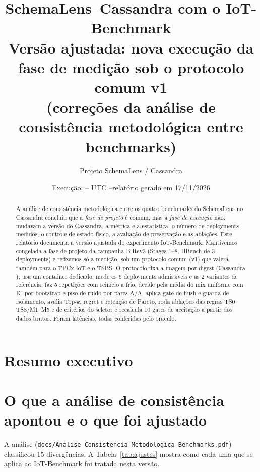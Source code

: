 \documentclass[11pt,a4paper]{article}
\title{\textbf{SchemaLens--Cassandra com o IoT-Benchmark}\\[4pt]
\large Versão ajustada: nova execução da fase de medição sob o protocolo comum v1\\
(correções da análise de consistência metodológica entre benchmarks)}
\author{Projeto SchemaLens / Cassandra}
\date{Execução: \envstarted--\envfinished{} UTC \quad--\quad relatório gerado em 17/11/2026}
\begin{document}
\maketitle

\begin{abstract}
\noindent A análise de consistência metodológica entre os quatro benchmarks do SchemaLens no Cassandra concluiu que a \emph{fase de projeto} é comum, mas a \emph{fase de execução} não: mudavam a versão do Cassandra, a métrica e a estatística, o número de deployments medidos, o controle de estado físico, a avaliação de preservação e as ablações. Este relatório documenta a versão ajustada do experimento IoT-Benchmark. Mantivemos congelada a fase de projeto da campanha B Rev3 (Stages 1--8, HBench de 3 deployments) e refizemos só a medição, sob um protocolo comum (v1) que valerá também para o TPCx-IoT e o TSBS. O protocolo fixa a imagem por digest (Cassandra \envversion), usa um container dedicado, mede os 6 deployments admissíveis e as 2 variantes de referência, faz 5 repetições com reinício a frio, decide pela média do mix uniforme com IC por bootstrap e piso de ruído por pares A/A, aplica gate de flush e guarda de isolamento, avalia Top-$k$, regret e retenção de Pareto, roda ablações das regras TS0--TS8/M1--M5 e de critérios do seletor e recalcula 10 gates de aceitação a partir dos dados brutos. Foram \envrawrows{} latências, todas conferidas pelo oráculo. 
\end{abstract}

\tableofcontents
\newpage

\section{Resumo executivo}


\section{O que a análise de consistência apontou e o que foi ajustado}
A análise (\texttt{docs/Analise\_Consistencia\_Metodologica\_Benchmarks.pdf}) classificou 15 divergências. A Tabela~\ref{tab:ajustes} mostra como cada uma que se aplica ao IoT-Benchmark foi tratada nesta versão.
\end{document}
